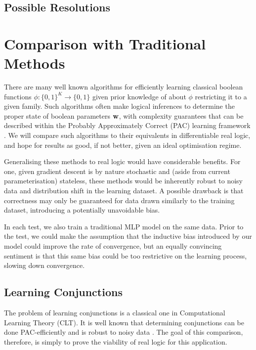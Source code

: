 \subsection{Possible Resolutions}



\section{Comparison with Traditional Methods}

There are many well known algorithms for efficiently learning classical boolean functions $\phi : \{0,1\}^K \to \{0,1\}$ given prior knowledge of about $\phi$ restricting it to a given family. Such algorithms often make logical inferences to determine the proper state of boolean parameters $\mathbf{w}$, with complexity guarantees that can be described within the Probably Approximately Correct (PAC) learning framework \cite{clt}. We will compare such algorithms to their equivalents in differentiable real logic, and hope for results as good, if not better, given an ideal optimisation regime. 

Generalising these methods to real logic would have considerable benefits. For one, given gradient descent is by nature stochastic and (aside from current parameterisation) stateless, these methods would be inherently robust to noisy data and distribution shift in the learning dataset. A possible drawback is that correctness may only be guaranteed for data drawn similarly to the training dataset, introducing a potentially unavoidable bias.

In each test, we also train a traditional MLP model on the same data. Prior to the test, we could make the assumption that the inductive bias introduced by our model could improve the rate of convergence, but an equally convincing sentiment is that this same bias could be too restrictive on the learning process, slowing down convergence.

\subsection{Learning Conjunctions}

The problem of learning conjunctions is a classical one in Computational Learning Theory (CLT). It is well known that determining conjunctions can be done PAC-efficiently \cite{clt} and is robust to noisy data \cite{noisyclt}. The goal of this comparison, therefore, is simply to prove the viability of real logic for this application.

